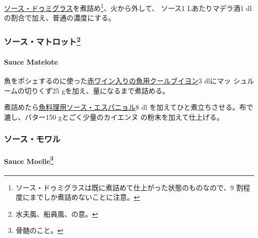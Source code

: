 \begin{recette}
  

\protect\hyperlink{sauce-demi-glace}{ソース・ドゥミグラス}を煮詰め\footnote{ソース・ドゥミグラスは既に煮詰めて仕上がった状態のものなので、9
  割程度にまでしか煮詰めないことに注意。}、火から外して、 ソース1
Lあたりマデラ酒1 dlの割合で加え、普通の濃度にする。

\maeaki

\hypertarget{ux30bdux30fcux30b9ux30deux30c8ux30edux30c3ux30c854}{%
\subsubsection[ソース・マトロット]{\texorpdfstring{ソース・マトロット\footnote{水夫風、船員風、の意。}}{ソース・マトロット}}\label{ux30bdux30fcux30b9ux30deux30c8ux30edux30c3ux30c854}}

\hypertarget{sauce-matelote}{%
\paragraph{Sauce Matelote}\label{sauce-matelote}}

   

魚をポシェするのに使った\href{}{赤ワイン入りの魚用クールブイヨン}3
dlにマッ シュルームの切りくず25
gを加え、\untiers{}量になるまで煮詰める。

煮詰めたら\protect\hyperlink{sauce-espagnole-maigre}{魚料理用ソース・エスパニョル}8
dl を加えてひと煮立ちさせる。布で漉し、バター150 gとごく少量のカイエンヌ
の粉末を加えて仕上げる。

\maeaki

\hypertarget{ux30bdux30fcux30b9ux30e2ux30efux30eb}{%
\subsubsection{ソース・モワル}\label{ux30bdux30fcux30b9ux30e2ux30efux30eb}}

\hypertarget{sauce-moelle}{%
\paragraph[Sauce Moelle]{\texorpdfstring{Sauce Moelle\footnote{骨髄のこと。}}{Sauce Moelle}}\label{sauce-moelle}}


\end{recette}
